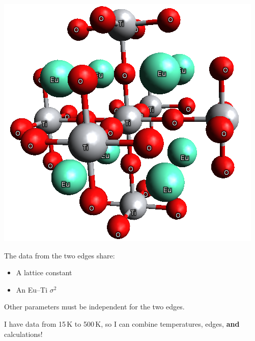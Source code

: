 \documentclass[10pt, xcolor=x11names, compress]{beamer}
\begin{document}
\begin{frame}
\begin{columns}[T]
\begin{column}{0.65\linewidth}
      \begin{center}
        \includegraphics[width=0.4\linewidth]{mds/eto.png}
      \end{center}

      The data from the two edges share:
      \begin{itemize}
      \item A lattice constant
      \item An Eu--Ti $\sigma^2$
      \end{itemize}
      Other parameters must be independent for the two edges.

      \smallskip

      I have data from 15\,K to 500\,K, so I can combine {\multiple}
      temperatures, {\multiple} edges, \textbf{and} {\multiple}
      {\feff} calculations!
    \end{column}
  \end{columns}
\end{frame}
\end{document}
